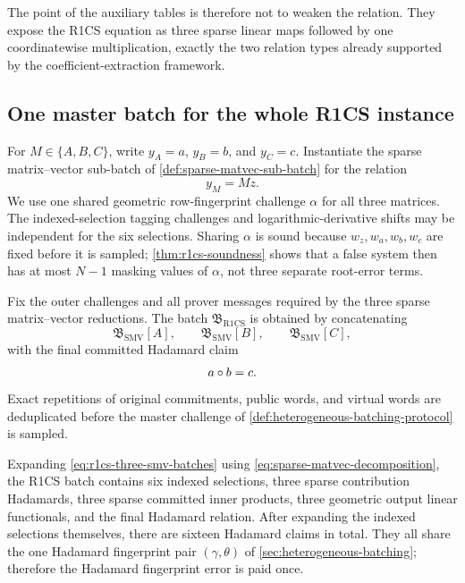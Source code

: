 The point of the auxiliary tables is therefore not to weaken the relation.  They expose the R1CS equation as three sparse linear maps followed by one coordinatewise multiplication, exactly the two relation types already supported by the coefficient-extraction framework.

\subsection{One master batch for the whole R1CS instance}
\label{sec:r1cs-master-batch}

For $M\in\{A,B,C\}$, write $y_A=a$, $y_B=b$, and $y_C=c$.  Instantiate the sparse matrix--vector sub-batch of \cref{def:sparse-matvec-sub-batch} for the relation
\begin{equation}
  y_M=Mz.
  \label{eq:r1cs-one-matvec}
\end{equation}
We use one shared geometric row-fingerprint challenge $\alpha$ for all three matrices.  The indexed-selection tagging challenges and logarithmic-derivative shifts may be independent for the six selections.  Sharing $\alpha$ is sound because $w_z,w_a,w_b,w_c$ are fixed before it is sampled; \cref{thm:r1cs-soundness} shows that a false system then has at most $N-1$ masking values of $\alpha$, not three separate root-error terms.

\begin{definition}
\label{def:r1cs-sub-batch}
Fix the outer challenges and all prover messages required by the three sparse matrix--vector reductions.  The batch $\mathfrak B_{\mathrm{R1CS}}$ is obtained by concatenating
\begin{equation}
  \mathfrak B_{\mathrm{SMV}}[A],
  \qquad
  \mathfrak B_{\mathrm{SMV}}[B],
  \qquad
  \mathfrak B_{\mathrm{SMV}}[C],
  \label{eq:r1cs-three-smv-batches}
\end{equation}
with the final committed Hadamard claim
\begin{equation}
  a\circ b=c.
  \label{eq:r1cs-final-hadamard-claim}
\end{equation}
Exact repetitions of original commitments, public words, and virtual words are deduplicated before the master challenge of \cref{def:heterogeneous-batching-protocol} is sampled.
\end{definition}

Expanding \eqref{eq:r1cs-three-smv-batches} using \eqref{eq:sparse-matvec-decomposition}, the R1CS batch contains six indexed selections, three sparse contribution Hadamards, three sparse committed inner products, three geometric output linear functionals, and the final Hadamard relation.  After expanding the indexed selections themselves, there are sixteen Hadamard claims in total.  They all share the one Hadamard fingerprint pair $(\gamma,\theta)$ of \cref{sec:heterogeneous-batching}; therefore the Hadamard fingerprint error is paid once.

